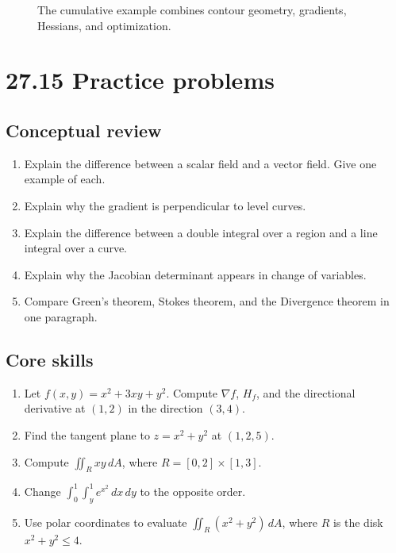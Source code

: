 \documentclass[11pt]{article}
\newcommand{\grad}{\nabla}
\begin{document}
\begin{figure}[H]
\centering
{}
\caption{The cumulative example combines contour geometry, gradients, Hessians, and optimization.}
\end{figure}

\section*{27.15 Practice problems}

\subsection*{Conceptual review}
\begin{enumerate}
  \item Explain the difference between a scalar field and a vector field. Give one example of each.
  \item Explain why the gradient is perpendicular to level curves.
  \item Explain the difference between a double integral over a region and a line integral over a curve.
  \item Explain why the Jacobian determinant appears in change of variables.
  \item Compare Green's theorem, Stokes theorem, and the Divergence theorem in one paragraph.
\end{enumerate}

\subsection*{Core skills}
\begin{enumerate}[start=6]
  \item Let $f(x,y)=x^2+3xy+y^2$. Compute $\grad f$, $H_f$, and the directional derivative at $(1,2)$ in the direction $(3,4)$.
  \item Find the tangent plane to $z=x^2+y^2$ at $(1,2,5)$.
  \item Compute $\iint_R xy\,dA$, where $R=[0,2]\times[1,3]$.
  \item Change $\int_0^1\int_y^1 e^{x^2}\,dx\,dy$ to the opposite order.
  \item Use polar coordinates to evaluate $\iint_R(x^2+y^2)\,dA$, where $R$ is the disk $x^2+y^2\le 4$.
\end{enumerate}
\end{document}
